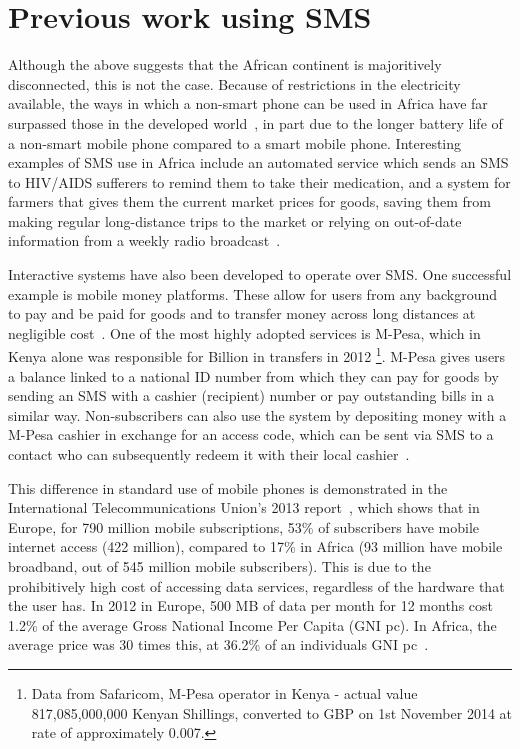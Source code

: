 \documentclass[authoryearcitations]{UoYCSproject}
\begin{document}
\section{Previous work using SMS}
Although the above suggests that the African continent is majoritively disconnected, this is not the case.  Because of restrictions in the electricity available, the ways in which a non-smart phone can be used in Africa have far surpassed those in the developed world~\cite{Fox:2011:Online}, in part due to the longer battery life of a non-smart mobile phone compared to a smart mobile phone.  Interesting examples of SMS use in Africa include an automated service which sends an SMS to HIV/AIDS sufferers to remind them to take their medication, and a system for farmers that gives them the current market prices for goods, saving them from making regular long-distance trips to the market or relying on out-of-date information from a weekly radio broadcast~\cite{Aker_Mobile_Phones_2010}.

Interactive systems have also been developed to operate over SMS.  One successful example is mobile money platforms.  These allow for users from any background to pay and be paid for goods and to transfer money across long distances at negligible cost~\cite{Aker_Mobile_Phones_2010}.  One of the most highly adopted services is M-Pesa, which in Kenya alone was responsible for  Billion in transfers in 2012 \footnote{Data from Safaricom, M-Pesa operator in Kenya - actual value 817,085,000,000 Kenyan Shillings, converted to GBP on 1st November 2014 at rate of approximately 0.007.}.  M-Pesa gives users a balance linked to a national ID number from which they can pay for goods by sending an SMS with a cashier (recipient) number or pay outstanding bills in a similar way.  Non-subscribers can also use the system by depositing money with a M-Pesa cashier in exchange for an access code, which can be sent via SMS to a contact who can subsequently redeem it with their local cashier~\cite{Aker_Mobile_Phones_2010}.

This difference in standard use of mobile phones is demonstrated in the International Telecommunications Union's 2013 report~\cite{ITU_Cell_Usage_2013}, which shows that in Europe, for 790 million mobile subscriptions, 53\% of subscribers have mobile internet access (422 million), compared to 17\% in Africa (93 million have mobile broadband, out of 545 million mobile subscribers).  This is due to the prohibitively high cost of accessing data services, regardless of the hardware that the user has.  In 2012 in Europe, 500 MB of data per month for 12 months cost 1.2\% of the average Gross National Income Per Capita (GNI pc).  In Africa, the average price was 30 times this, at 36.2\% of an individuals GNI pc~\cite{ITU_Information_Society_2013}.
\end{document}
